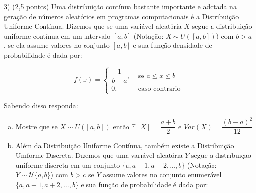 \documentclass[12pt]{article}
\begin{document}
\begin{enumerate}[a)]





3) (2,5 pontos) Uma distribuição contínua bastante importante e adotada na geração de números aleatórios em programas computacionais é a Distribuição Uniforme Contínua. 
Dizemos que se uma variável aleatória $X$ segue a distribuição uniforme contínua em um intervalo $[a,b]$ (Notação: $X \sim U([a,b])$) com $b > a$, se ela assume valores
no conjunto $[a,b]$ e sua função densidade de probabilidade é dada por:

$$f(x) = \begin{cases}
\dfrac{1}{b-a}, & \text{ se } a \leq  x \leq b \\
0, & \text{ caso contrário}
\end{cases}$$

Sabendo disso responda:

\begin{enumerate}[a)]
    \item Mostre que se $X \sim U([a,b])$ então $\mathbb{E}[X] = \dfrac{a+b}{2}$ e $Var(X) = \dfrac{(b-a)^2}{12}$
    \item Além da Distribuição Uniforme Contínua, também existe a Distribuição Uniforme Discreta. 
    Dizemos que uma variável aleatória $Y$ segue a distribuição uniforme discreta em um conjunto $\{a, a+1, a+2, \dots, b\}$ (Notação: $Y \sim \mathcal{U}\{a,b\}$) com $b > a$ se $Y$ assume valores no conjunto enumerável
    $\{a, a+1, a+2, \dots, b\}$ e sua função de probabilidade é dada por:


\end{enumerate}
\end{enumerate}
\end{document}

